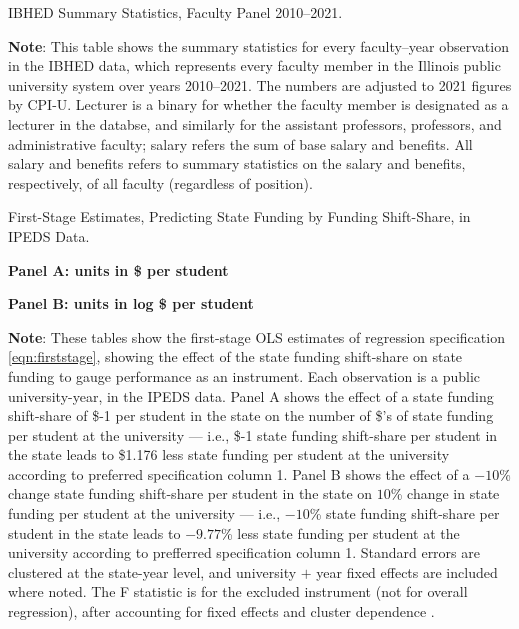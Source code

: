 \begin{table}[H]
    \singlespacing
    \centering
    \caption{IBHED Summary Statistics, Faculty Panel 2010--2021.}
    \makebox[\textwidth][c]{}
    \label{tab:illinois-summary}
    \justify
    \footnotesize
    \textbf{Note}:
    This table shows the summary statistics for every faculty--year observation in the IBHED data, which represents every faculty member in the Illinois public university system over years 2010--2021.
    The numbers are adjusted to 2021 figures by CPI-U.
    Lecturer is a binary for whether the faculty member is designated as a lecturer in the databse, and similarly for the assistant professors, professors, and administrative faculty;
    salary refers the sum of base salary and benefits.
    All salary and benefits refers to summary statistics on the salary and benefits, respectively, of all faculty (regardless of position).
\end{table}


\begin{table}[H]
    \singlespacing
    \centering
    \caption{First-Stage Estimates, Predicting State Funding by Funding Shift-Share, in IPEDS Data.}
    \textbf{Panel A: units in \$ per student}
    
    \makebox[\textwidth][c]{}
    
    \textbf{Panel B: units in log \$ per student}
    
    \makebox[\textwidth][c]{}

    \label{tab:firststage-reg}
    \justify
    \footnotesize
    \textbf{Note}:
    These tables show the first-stage OLS estimates of regression specification \eqref{eqn:firststage}, showing the effect of the state funding shift-share on state funding to gauge performance as an instrument.
    Each observation is a public university-year, in the IPEDS data.
    Panel A shows the effect of a state funding shift-share of \$-1 per student in the state on the number of \$'s of state funding per student at the university --- i.e.,
    \$-1 state funding shift-share per student in the state leads to \$1.176 less state funding per student at the university according to preferred specification column 1.
    Panel B shows the effect of a $-10$\% change state funding shift-share per student in the state on $10$\% change in state funding per student at the university --- i.e.,
    $-10$\% state funding shift-share per student in the state leads to $-9.77$\% less state funding per student at the university according to prefferred specification column 1.        
    Standard errors are clustered at the state-year level, and university $+$ year fixed effects are included where noted.
    The F statistic is for the excluded instrument (not for overall regression), after accounting for fixed effects and cluster dependence \citep{olea2013robust}.
\end{table}


